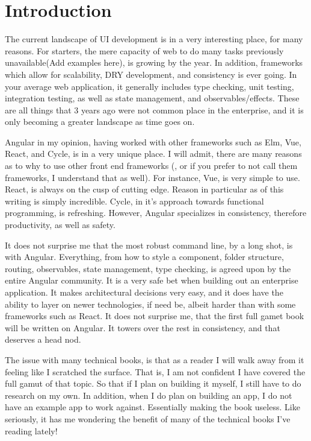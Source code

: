 \chapter{Introduction}

The current landscape of UI development is in a very interesting place, for many
reasons. For starters, the mere capacity of web to do many tasks previously
unavailable(Add examples here), is growing by the year. In addition, frameworks
which allow for scalability, DRY development, and consistency is ever going. In
your average web application, it generally includes type checking, unit testing,
integration testing, as well as state management, and observables/effects. These
are all things that 3 years ago were not common place in the enterprise, and it
is only becoming a greater landscape as time goes on.

Angular in my opinion, having worked with other frameworks such as Elm, Vue,
React, and Cycle, is in a very unique place. I will admit, there are many
reasons as to why to use other front end frameworks (, or if you prefer to
not call them frameworks, I understand that as well). For instance, Vue, is very
simple to use. React, is always on the cusp of cutting edge. Reason in
particular as of this writing is simply incredible. Cycle, in it's approach
towards functional programming, is refreshing. However, Angular specializes in
consistency, therefore productivity, as well as safety.

It does not surprise me that the most robust command line, by a long shot, is
with Angular. Everything, from how to style a component, folder structure,
routing, observables, state management, type checking, is agreed upon by the
entire Angular community. It is a very safe bet when building out an enterprise
application. It makes architectural decisions very easy, and it does have the
ability to layer on newer technologies, if need be, albeit harder than with some
frameworks such as React. It does not surprise me, that the first full gamet
book will be written on Angular. It towers over the rest in consistency, and
that deserves a head nod.

The issue with many technical books, is that as a reader I will walk away from
it feeling like I scratched the surface. That is, I am not confident I have
covered the full gamut of that topic. So that if I plan on building it myself,
I still have to do research on my own. In addition, when I do plan on building
an app, I do not have an example app to work against. Essentially making the
book useless. Like seriously, it has me wondering the benefit of many of the
technical books I've reading lately!

